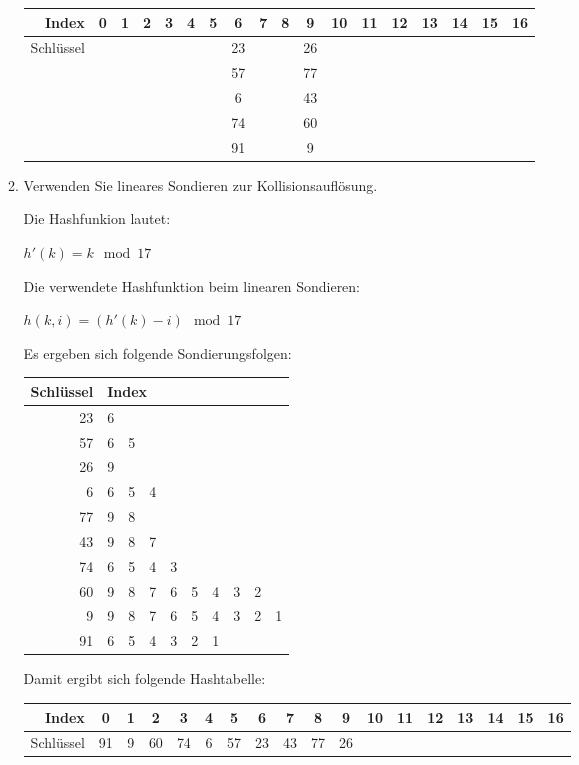 \documentclass{lehramt-informatik-haupt}
\begin{document}
\begin{enumerate}
\begin{enumerate}
\begin{antwort}
{
\setlength{\tabcolsep}{2pt}
\footnotesize
\begin{tabular}{r|ccccccccccccccccc}
Index & 0 & 1 & 2 & 3 & 4 & 5 & 6 & 7 & 8 & 9 & 10 & 11 & 12 & 13 & 14 & 15 & 16 \\\hline
Schlüssel &&&&&&&23&&&26&&&&&&&\\
          &&&&&&&57&&&77&&&&&&&\\
          &&&&&&&6 &&&43&&&&&&&\\
          &&&&&&&74&&&60&&&&&&&\\
          &&&&&&&91&&&9 &&&&&&&\\
\end{tabular}
}
\end{antwort}


\item Verwenden Sie lineares Sondieren zur Kollisionsauflösung.

\def\tmp#1{{\tiny($#1$)}}

\begin{antwort}
\def\tmp#1{{\footnotesize#1}}

Die Hashfunkion lautet:

\tmp{$h'(k) = k \mod 17$}

Die verwendete Hashfunktion beim linearen Sondieren:

\tmp{$h(k, i) = (h'(k) - i) \mod 17$}

\bigskip

Es ergeben sich folgende Sondierungsfolgen:
{
\setlength{\tabcolsep}{2pt}
\footnotesize

\begin{tabular}{r|ccccccccc}
Schlüssel & \multicolumn{6}{l}{Index}\\\hline
23 & 6\\
57 & 6 & 5\\
26 & 9\\
6  & 6 & 5 & 4\\
77 & 9 & 8\\
43 & 9 & 8 & 7\\
74 & 6 & 5 & 4 & 3 \\
60 & 9 & 8 & 7 & 6 & 5 & 4 & 3 & 2\\
9  & 9 & 8 & 7 & 6 & 5 & 4 & 3 & 2 & 1 \\
91 & 6 & 5 & 4 & 3 & 2 & 1\\
\end{tabular}

Damit ergibt sich folgende Hashtabelle:

\begin{tabular}{r|ccccccccccccccccc}
Index & 0 & 1 & 2 & 3 & 4 & 5 & 6 & 7 & 8 & 9 & 10 & 11 & 12 & 13 & 14 & 15 & 16 \\\hline
Schlüssel &91&9&60&74&6&57&23&43&77&26&&&&&&&\\
\end{tabular}
}
\end{antwort}


\end{enumerate}
\end{enumerate}
\end{document}
